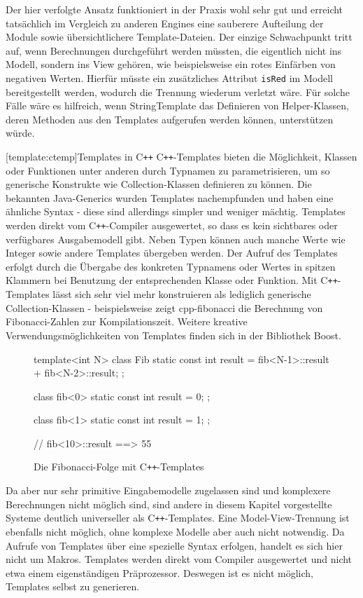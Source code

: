 \documentclass[11pt, a4paper, bibgerm]{scrbook}
\newcommand\icode[1]{\lstinline?#1?}
\newcommand\lsection{}
\newcommand\abb{}
\newcommand{\cpp}{C\texttt{++}}
\begin{document}
Der hier verfolgte Ansatz funktioniert in der Praxis wohl sehr gut und
erreicht tatsächlich im Vergleich zu anderen Engines eine sauberere
Aufteilung der Module sowie übersichtlichere Template-Dateien. Der
einzige Schwachpunkt tritt auf, wenn Berechnungen durchgeführt werden
müssten, die eigentlich nicht ins Modell, sondern ins View gehören, wie
beispielsweise ein rotes Einfärben von negativen Werten. Hierfür müsste
ein zusätzliches Attribut \icode{isRed} im Modell bereitgestellt werden,
wodurch die Trennung wiederum verletzt wäre. Für solche Fälle wäre es
hilfreich, wenn StringTemplate das Definieren von Helper-Klassen, deren
Methoden aus den Templates aufgerufen werden können, unterstützen würde.

\lsection[template:ctemp]{Templates in \cpp{}} \cpp{}-Templates
bieten die Möglichkeit, Klassen oder Funktionen unter anderen durch
Typnamen zu parametrisieren, um so generische Konstrukte wie
Collection-Klassen definieren zu können. Die bekannten Java-Generics
\cite{JavaGenerics} wurden Templates nachempfunden und haben eine ähnliche
Syntax - diese sind allerdings simpler und weniger mächtig. Templates
werden direkt vom \cpp{}-Compiler ausgewertet, so dass es kein
sichtbares oder verfügbares Ausgabemodell gibt. Neben Typen können auch
manche Werte wie Integer sowie andere Templates übergeben werden. Der
Aufruf des Templates erfolgt durch die Übergabe des konkreten Typnamens
oder Wertes in spitzen Klammern bei Benutzung der entsprechenden Klasse
oder Funktion. Mit \cpp{}-Templates lässt sich sehr viel mehr
konstruieren als lediglich generische Collection-Klassen -
beispielsweise zeigt \abb{cpp-fibonacci} die Berechnung von
Fibonacci-Zahlen zur Kompilationszeit. Weitere kreative
Verwendungsmöglichkeiten von Templates finden sich in der Bibliothek
Boost\cite{Boost}.
\begin{figure}
  \centering
  \begin{code}
template<int N> class Fib {
  static const int result = fib<N-1>::result + fib<N-2>::result;
};

class fib<0> {
  static const int result = 0;
};

class fib<1> {
  static const int result = 1;
};

// fib<10>::result  ==> 55
  \end{code}
  \caption{Die Fibonacci-Folge mit \cpp{}-Templates}
  \label{magicl:fig:cpp-fibonacci}
\end{figure}
Da aber nur sehr primitive Eingabemodelle zugelassen sind und komplexere
Berechnungen nicht möglich sind, sind andere in diesem Kapitel
vorgestellte Systeme deutlich universeller als \cpp{}-Templates. Eine
Model-View-Trennung ist ebenfalls nicht möglich, ohne komplexe Modelle
aber auch nicht notwendig. Da Aufrufe von Templates über eine spezielle
Syntax erfolgen, handelt es sich hier nicht um Makros. Templates werden
direkt vom Compiler ausgewertet und nicht etwa einem eigenständigen
Präprozessor. Deswegen ist es nicht möglich, Templates selbst zu
generieren.
\end{document}
